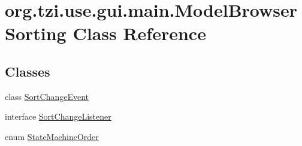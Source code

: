 \hypertarget{classorg_1_1tzi_1_1use_1_1gui_1_1main_1_1_model_browser_sorting}{\section{org.\-tzi.\-use.\-gui.\-main.\-Model\-Browser\-Sorting Class Reference}
\label{classorg_1_1tzi_1_1use_1_1gui_1_1main_1_1_model_browser_sorting}
}
\subsection*{Classes}
\begin{DoxyCompactItemize}
\item 
class \hyperlink{classorg_1_1tzi_1_1use_1_1gui_1_1main_1_1_model_browser_sorting_1_1_sort_change_event}{Sort\-Change\-Event}
\item 
interface \hyperlink{interfaceorg_1_1tzi_1_1use_1_1gui_1_1main_1_1_model_browser_sorting_1_1_sort_change_listener}{Sort\-Change\-Listener}
\item 
enum \hyperlink{enumorg_1_1tzi_1_1use_1_1gui_1_1main_1_1_model_browser_sorting_1_1_state_machine_order}{State\-Machine\-Order}
\end{DoxyCompactItemize}
